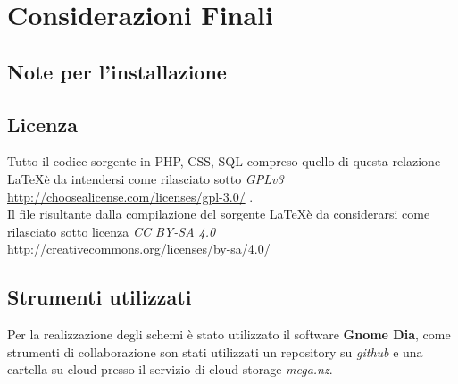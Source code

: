 \chapter{Considerazioni Finali} 

\section{Note per l'installazione}

\section{Licenza}
Tutto il codice sorgente in PHP, CSS, SQL compreso quello di questa relazione \LaTeX  è da intendersi come rilasciato sotto \textit{GPLv3}\\
\url{http://choosealicense.com/licenses/gpl-3.0/} 
 . \\ Il file risultante dalla compilazione del sorgente \LaTeX è da considerarsi come rilasciato sotto licenza \textit{CC BY-SA 4.0}\\ \url{http://creativecommons.org/licenses/by-sa/4.0/} 

\section{Strumenti utilizzati}
Per la realizzazione degli schemi è stato utilizzato il software \textbf{Gnome Dia}, come strumenti di collaborazione son stati utilizzati un repository su \textit{github} e una cartella su cloud presso il servizio di cloud storage \textit{mega.nz}.